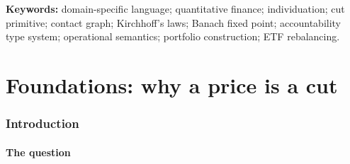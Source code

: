 \documentclass[11pt,a4paper]{article}
\theoremstyle{thmstyle}
\theoremstyle{definition}
\theoremstyle{remark}
\newcommand{\sh}[1]{\texttt{#1}}
\begin{document}
\begin{abstract}
market --- is rejected at compile time; (v)~a small-step operational
semantics in which evaluation \emph{is} measurement, with a monotone
committed-cut count as an intrinsic, non-decreasing clock; (vi)~a
standard library binding each verb to a named theorem proved in this
paper --- \sh{cut} to the Price-Cell theorem, \sh{bond} to a Kirchhoff
conductance criterion, \sh{close} to the Kirchhoff Portfolio Formula,
and \sh{track} to Banach-contraction rebalancing --- each restated and
re-proved here from first principles, with the numerical values every
implementation must reproduce; and (vii)~a two-target compilation
model: a Rust reference implementation realising cuts as exact
minimum-cut and pseudoinverse computations, and a TypeScript/WebGL\,2
interactive runtime realising cuts as GPU render passes, proved
observationally equivalent up to the floor. The specification is
implementable as written.
\end{abstract}

\noindent\textbf{Keywords:} domain-specific language; quantitative
finance; individuation; cut primitive; contact graph; Kirchhoff's laws;
Banach fixed point; accountability type system; operational semantics;
portfolio construction; ETF rebalancing.

\tableofcontents

\part{Foundations: why a price is a cut}

\section{Introduction}
\label{sec:intro}

\subsection{The question}
\end{document}
